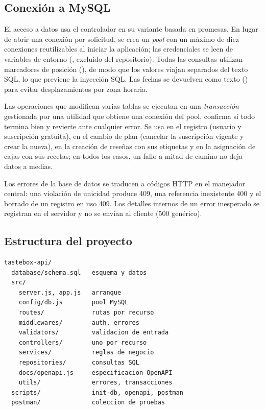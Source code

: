 \subsection{Conexión a MySQL}
El acceso a datos usa el controlador  en su variante basada en promesas. En lugar de abrir una conexión por solicitud, se crea un \emph{pool} con un máximo de diez conexiones reutilizables al iniciar la aplicación; las credenciales se leen de variables de entorno (, excluido del repositorio). Todas las consultas utilizan marcadores de posición (), de modo que los valores viajan separados del texto SQL, lo que previene la inyección SQL. Las fechas se devuelven como texto () para evitar desplazamientos por zona horaria.

Las operaciones que modifican varias tablas se ejecutan en una \emph{transacción} gestionada por una utilidad que obtiene una conexión del pool, confirma si todo termina bien y revierte ante cualquier error. Se usa en el registro (usuario y suscripción gratuita), en el cambio de plan (cancelar la suscripción vigente y crear la nueva), en la creación de reseñas con sus etiquetas y en la asignación de cajas con sus recetas; en todos los casos, un fallo a mitad de camino no deja datos a medias.

Los errores de la base de datos se traducen a códigos HTTP en el manejador central: una violación de unicidad produce 409, una referencia inexistente 400 y el borrado de un registro en uso 409. Los detalles internos de un error inesperado se registran en el servidor y no se envían al cliente (500 genérico).

\subsection{Estructura del proyecto}
\begin{footnotesize}
\begin{verbatim}
tastebox-api/
  database/schema.sql   esquema y datos
  src/
    server.js, app.js   arranque
    config/db.js        pool MySQL
    routes/             rutas por recurso
    middlewares/        auth, errores
    validators/         validacion de entrada
    controllers/        uno por recurso
    services/           reglas de negocio
    repositories/       consultas SQL
    docs/openapi.js     especificacion OpenAPI
    utils/              errores, transacciones
  scripts/              init-db, openapi, postman
  postman/              coleccion de pruebas
\end{verbatim}
\end{footnotesize}

